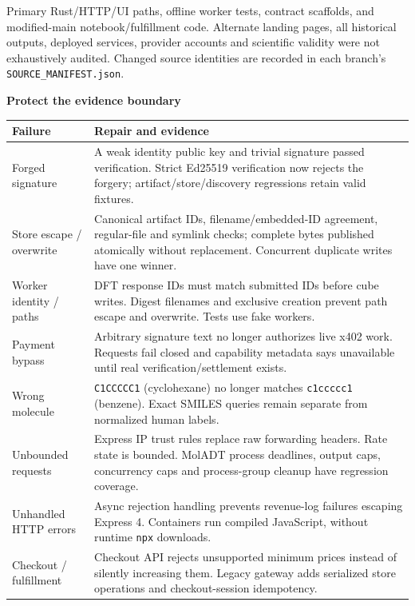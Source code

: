 \documentclass[10pt,a4paper]{article}
\newcommand{\titleline}[2]{\vspace*{3mm}{\small\sffamily\color{teal}#1}\par{\huge\sffamily\bfseries\color{ink}#2}\par\vspace{3mm}}
\newcommand{\sub}[1]{\vspace{3mm}{\large\sffamily\bfseries\color{ink}#1}\par}
\begin{document}
\sub{Review coverage}
Primary Rust/HTTP/UI paths, offline worker tests, contract scaffolds, and modified-main notebook/fulfillment code. Alternate landing pages, all historical outputs, deployed services, provider accounts and scientific validity were not exhaustively audited. Changed source identities are recorded in each branch's \texttt{SOURCE\_MANIFEST.json}.
\newpage
\titleline{02 / IMPLEMENTED FIXES}{Protect the evidence boundary}
\begin{tabularx}{\textwidth}{@{}>{\raggedright\arraybackslash}p{31mm}Y@{}}\toprule
\textbf{Failure} & \textbf{Repair and evidence}\\\midrule
Forged signature & A weak identity public key and trivial signature passed verification. Strict Ed25519 verification now rejects the forgery; artifact/store/discovery regressions retain valid fixtures.\\\addlinespace
Store escape / overwrite & Canonical artifact IDs, filename/embedded-ID agreement, regular-file and symlink checks; complete bytes published atomically without replacement. Concurrent duplicate writes have one winner.\\\addlinespace
Worker identity / paths & DFT response IDs must match submitted IDs before cube writes. Digest filenames and exclusive creation prevent path escape and overwrite. Tests use fake workers.\\\addlinespace
Payment bypass & Arbitrary signature text no longer authorizes live x402 work. Requests fail closed and capability metadata says unavailable until real verification/settlement exists.\\\addlinespace
Wrong molecule & \texttt{C1CCCCC1} (cyclohexane) no longer matches \texttt{c1ccccc1} (benzene). Exact SMILES queries remain separate from normalized human labels.\\\addlinespace
Unbounded requests & Express IP trust rules replace raw forwarding headers. Rate state is bounded. MolADT process deadlines, output caps, concurrency caps and process-group cleanup have regression coverage.\\\addlinespace
Unhandled HTTP errors & Async rejection handling prevents revenue-log failures escaping Express 4. Containers run compiled JavaScript, without runtime \texttt{npx} downloads.\\\addlinespace
Checkout / fulfillment & Checkout API rejects unsupported minimum prices instead of silently increasing them. Legacy gateway adds serialized store operations and checkout-session idempotency.\\\bottomrule
\end{tabularx}
\end{document}

